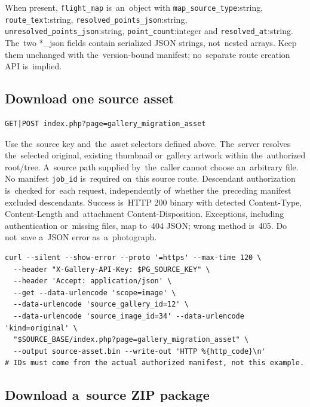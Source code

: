 \documentclass[11pt,a4paper]{article}
\newcommand{\codeword}[1]{\nolinkurl{#1}}
\begin{document}
When present, \codeword{flight_map} is~an~object with \codeword{map_source_type}:string,
\codeword{route_text}:string, \codeword{resolved_points_json}:string,
\codeword{unresolved_points_json}:string, \codeword{point_count}:integer and
\codeword{resolved_at}:string. The~two *\_json fields contain serialized JSON strings,
not~nested arrays. Keep them unchanged with the~version-bound manifest; no~separate route
creation API is~implied.

\subsection{\texorpdfstring{Download one source asset}{Download one source asset}}

\label{api352:migration-asset}

\begin{lstlisting}[language={}]
GET|POST index.php?page=gallery_migration_asset
\end{lstlisting}

Use the~source key and~the~asset selectors defined above. The~server resolves the~selected
original, existing thumbnail or~gallery artwork within the~authorized root/tree. A~source
path supplied by~the~caller cannot choose an~arbitrary file. No manifest \codeword{job_id}
is~required on~this source route. Descendant authorization is~checked for~each request,
independently of~whether the~preceding manifest excluded descendants. Success is~HTTP 200
binary with detected Content-Type, Content-Length and~attachment Content-Disposition.
Exceptions, including authentication or~missing files, map to~404 JSON; wrong method is~405.
Do not~save a~JSON error as~a~photograph.

\begin{lstlisting}[language={}]
curl --silent --show-error --proto '=https' --max-time 120 \
  --header "X-Gallery-API-Key: $PG_SOURCE_KEY" \
  --header 'Accept: application/json' \
  --get --data-urlencode 'scope=image' \
  --data-urlencode 'source_gallery_id=12' \
  --data-urlencode 'source_image_id=34' --data-urlencode 'kind=original' \
  "$SOURCE_BASE/index.php?page=gallery_migration_asset" \
  --output source-asset.bin --write-out 'HTTP %{http_code}\n'
# IDs must come from the actual authorized manifest, not this example.
\end{lstlisting}

\subsection{\texorpdfstring{Download a~source ZIP package}{Download a source ZIP package}}
\end{document}
